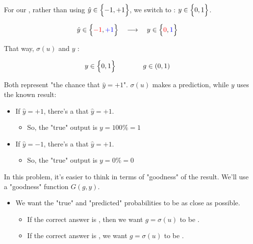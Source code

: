         \begin{notation}
            For our , rather than using $\hat{y} \in \Bigl\{-1,+1\Bigr\}$, we switch to : $ y \in \Bigl\{0,1\Bigr\}$.

            \begin{equation*}
                \hat{y} \in \Bigl\{\textcolor{red}{-1},\textcolor{blue}{+1}\Bigr\} 
                \quad \longrightarrow \quad
                y \in \Bigl\{\textcolor{red}{0},\textcolor{blue}{1}\Bigr\}
            \end{equation*}
            
            That way, $\sigma(u)$ and $y$ :
            
            \begin{equation*}
                y \in \Bigl\{0,1\Bigr\} \qquad \qquad g \in (0,1)
            \end{equation*}

            Both represent "the chance that $\hat{y}=+1$". $\sigma(u)$ makes a prediction, while $y$ uses the known result:

            \begin{itemize}
                \item If $\hat{y}=+1$, there's a  that $\hat{y}=+1$.
                    \begin{itemize}
                        \item So, the "true" output is $y = 100\%=1$
                    \end{itemize}
                \item If $\hat{y}=-1$, there's a  that $\hat{y}=+1$. 
                    \begin{itemize}
                        \item So, the "true" output is $y=0\%=0$
                    \end{itemize}
            \end{itemize}
        \end{notation}
        
        In this problem, it's easier to think in terms of "goodness" of the result. We'll use a "goodness" function $G(g,y)$.  

        \begin{itemize}
            \item We want the "true" and "predicted" probabilities to be as close as possible.
                \begin{itemize}
                    \item If the correct answer is , then we want $g=\sigma(u)$ to be .
                    \item If the correct answer is , we want $g=\sigma(u)$ to be .
                \end{itemize}
        \end{itemize}
        
